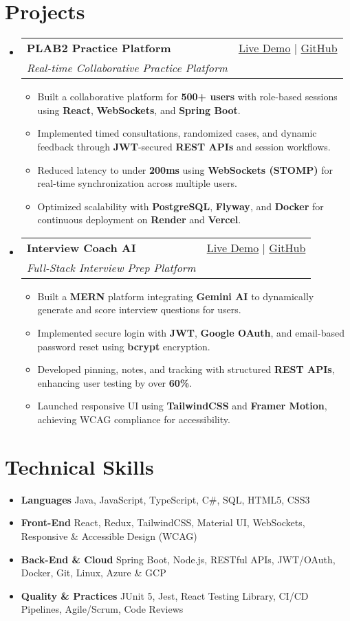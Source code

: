 \documentclass[letterpaper,11pt]{article}
\makeatletter
\newcommand{\resumeItem}[1]{\item\small{#1 \vspace{-2pt}}}
\newcommand{\resumeSubheading}[4]{
  \vspace{-1pt}\item
    \begin{tabular*}{0.97\textwidth}[t]{l@{\extracolsep{\fill}}r}
      \textbf{#1} & #2 \\
      \textit{\small#3} & \textit{\small #4} \\
    \end{tabular*}\vspace{-5pt}
}
\newcommand{\resumeSubHeadingListStart}{\begin{itemize}[leftmargin=*]}
\newcommand{\resumeSubHeadingListEnd}{\end{itemize}}
\newcommand{\resumeItemListStart}{\begin{itemize}}
\newcommand{\resumeItemListEnd}{\end{itemize}\vspace{-5pt}}
\makeatother
\begin{document}
\section{Projects}
  \resumeSubHeadingListStart
    \resumeSubheading
      {\textbf{PLAB2 Practice Platform}}{\href{https://plab2practice.com}{Live Demo} | \href{https://github.com/altansaid/plab2projectnew}{GitHub}}
      {Real-time Collaborative Practice Platform}{}
      \resumeItemListStart
        \resumeItem{Built a collaborative platform for \textbf{500+ users} with role-based sessions using \textbf{React}, \textbf{WebSockets}, and \textbf{Spring Boot}.}
        \resumeItem{Implemented timed consultations, randomized cases, and dynamic feedback through \textbf{JWT}-secured \textbf{REST APIs} and session workflows.}
        \resumeItem{Reduced latency to under \textbf{200ms} using \textbf{WebSockets (STOMP)} for real-time synchronization across multiple users.}
        \resumeItem{Optimized scalability with \textbf{PostgreSQL}, \textbf{Flyway}, and \textbf{Docker} for continuous deployment on \textbf{Render} and \textbf{Vercel}.}
      \resumeItemListEnd

    \resumeSubheading
      {\textbf{Interview Coach AI}}{\href{https://interviewcoach-ai.vercel.app}{Live Demo} | \href{https://github.com/altansaid/interviewcoach-ai}{GitHub}}
      {Full-Stack Interview Prep Platform}{}
      \resumeItemListStart
        \resumeItem{Built a \textbf{MERN} platform integrating \textbf{Gemini AI} to dynamically generate and score interview questions for users.}
        \resumeItem{Implemented secure login with \textbf{JWT}, \textbf{Google OAuth}, and email-based password reset using \textbf{bcrypt} encryption.}
        \resumeItem{Developed pinning, notes, and tracking with structured \textbf{REST APIs}, enhancing user testing by over \textbf{60\%}.}
        \resumeItem{Launched responsive UI using \textbf{TailwindCSS} and \textbf{Framer Motion}, achieving WCAG compliance for accessibility.}
      \resumeItemListEnd
  \resumeSubHeadingListEnd

\section{Technical Skills}
  \resumeItemListStart
    \resumeItem{\textbf{Languages}}{Java, JavaScript, TypeScript, C\#, SQL, HTML5, CSS3}
    \resumeItem{\textbf{Front-End}}{React, Redux, TailwindCSS, Material UI, WebSockets, Responsive \& Accessible Design (WCAG)}
    \resumeItem{\textbf{Back-End \& Cloud}}{Spring Boot, Node.js, RESTful APIs, JWT/OAuth, Docker, Git, Linux, Azure \& GCP}
    \resumeItem{\textbf{Quality \& Practices}}{JUnit 5, Jest, React Testing Library, CI/CD Pipelines, Agile/Scrum, Code Reviews}
  \resumeItemListEnd
\end{document}
